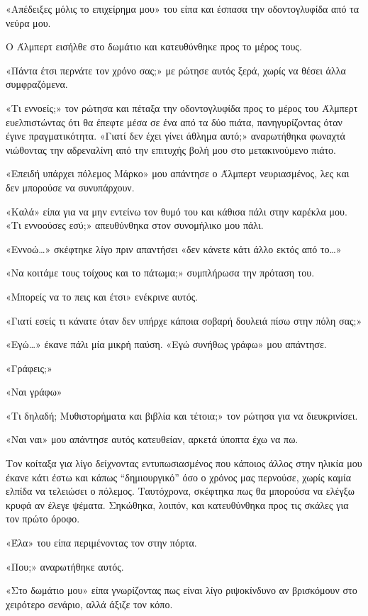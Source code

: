 \documentclass[12pt,twoside, openany]{book}
\begin{document}
«Απέδειξες μόλις το επιχείρημα μου» του είπα και έσπασα την οδοντογλυφίδα από τα νεύρα μου.

Ο Άλμπερτ εισήλθε στο δωμάτιο και κατευθύνθηκε προς το μέρος τους.

«Πάντα έτσι περνάτε τον χρόνο σας;» με ρώτησε αυτός ξερά, χωρίς να θέσει άλλα συμφραζόμενα.

«Τι εννοείς;» τον ρώτησα και πέταξα την οδοντογλυφίδα προς το μέρος του Άλμπερτ ευελπιστώντας ότι θα έπεφτε μέσα σε ένα από τα δύο πιάτα, πανηγυρίζοντας όταν έγινε πραγματικότητα. «Γιατί δεν έχει γίνει άθλημα αυτό;» αναρωτήθηκα φωναχτά νιώθοντας την αδρεναλίνη από την επιτυχής βολή μου στο μετακινούμενο πιάτο.

«Επειδή υπάρχει πόλεμος Μάρκο» μου απάντησε ο Άλμπερτ νευριασμένος, λες και δεν μπορούσε να συνυπάρχουν.

«Καλά» είπα για να μην εντείνω τον θυμό του και κάθισα πάλι στην καρέκλα μου. «Τι εννοούσες εσύ;» απευθύνθηκα στον συνομήλικο μου πάλι.

«Εννοώ…» σκέφτηκε λίγο πριν απαντήσει «δεν κάνετε κάτι άλλο εκτός από το…»

«Να κοιτάμε τους τοίχους και το πάτωμα;» συμπλήρωσα την πρόταση του.

«Μπορείς να το πεις και έτσι» ενέκρινε αυτός.

«Γιατί εσείς τι κάνατε όταν δεν υπήρχε κάποια σοβαρή δουλειά πίσω στην πόλη σας;»

«Εγώ…» έκανε πάλι μία μικρή παύση. «Εγώ συνήθως γράφω» μου απάντησε.

«Γράφεις;»

«Ναι γράφω»

«Τι δηλαδή; Μυθιστορήματα και βιβλία και τέτοια;» τον ρώτησα για να διευκρινίσει.

«Ναι ναι» μου απάντησε αυτός κατευθείαν, αρκετά ύποπτα έχω να πω.

Τον κοίταξα για λίγο δείχνοντας εντυπωσιασμένος που κάποιος άλλος στην ηλικία μου έκανε κάτι έστω και κάπως “δημιουργικό” όσο ο χρόνος μας περνούσε, χωρίς καμία ελπίδα να τελειώσει ο πόλεμος. Ταυτόχρονα, σκέφτηκα πως θα μπορούσα να ελέγξω κρυφά αν έλεγε ψέματα. Σηκώθηκα, λοιπόν, και κατευθύνθηκα προς τις σκάλες για τον πρώτο όροφο.

«Έλα» του είπα περιμένοντας τον στην πόρτα.

«Που;» αναρωτήθηκε αυτός.

«Στο δωμάτιο μου» είπα γνωρίζοντας πως είναι λίγο ριψοκίνδυνο αν βρισκόμουν στο χειρότερο σενάριο, αλλά άξιζε τον κόπο.
\end{document}
